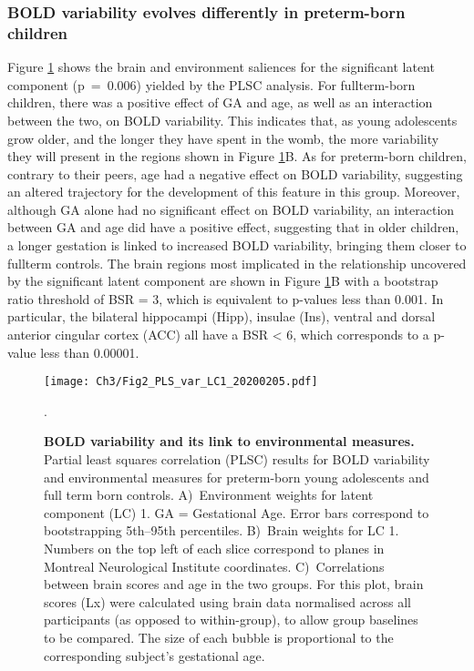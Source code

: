 \subsubsection*{BOLD variability evolves differently in preterm-born children} 
Figure \ref{fig:PLS_var} shows the brain and environment saliences for the significant latent component (p~=~0.006) yielded by the PLSC analysis. For fullterm-born children, there was a positive effect of GA and age, as well as an interaction between the two, on BOLD variability. This indicates that, as young adolescents grow older, and the longer they have spent in the womb, the more variability they will present in the regions shown in Figure \ref{fig:PLS_var}B. As for preterm-born children, contrary to their peers, age had a negative effect on BOLD variability, suggesting an altered trajectory for the development of this feature in this group. Moreover, although GA alone had no significant effect on BOLD variability, an interaction between GA and age did have a positive effect, suggesting that in older children, a longer gestation is linked to increased BOLD variability, bringing them closer to fullterm controls. The brain regions most implicated in the relationship uncovered by the significant latent component are shown in  Figure \ref{fig:PLS_var}B with a bootstrap ratio threshold of BSR = 3, which is equivalent to p-values less than 0.001.  In particular, the bilateral hippocampi (Hipp), insulae (Ins), ventral and dorsal anterior cingular cortex (ACC) all have a BSR < 6, which corresponds to a p-value less than 0.00001.



\begin{figure}[h!] 
\centering\texttt{[image: Ch3/Fig2\_PLS\_var\_LC1\_20200205.pdf]}
\caption{\textbf{BOLD variability and its link to environmental measures.} Partial least squares correlation (PLSC) results for BOLD variability and environmental measures for preterm-born young adolescents and full term born controls.  A)~Environment weights for latent component (LC) 1. GA = Gestational Age. Error bars correspond to bootstrapping 5th--95th percentiles. B)~Brain weights for LC 1. Numbers on the top left of each slice correspond to planes in Montreal Neurological Institute coordinates. C)~Correlations between brain scores and age in the two groups. For this plot, brain scores (Lx) were calculated using brain data normalised across all participants (as opposed to within-group), to allow group baselines to be compared. The size of each bubble is proportional to the corresponding subject's gestational age. %
}. \label{fig:PLS_var}
\end{figure}



